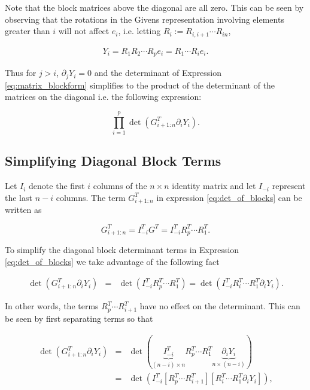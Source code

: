 \documentclass[ba]{imsart}
\numberwithin{equation}{section}
\theoremstyle{plain}
\begin{document}
\noindent Note that the block matrices above the diagonal are all zero.  This can be seen by observing that the rotations in the Givens representation involving elements greater than $i$ will not affect $e_i$, i.e. letting $R_i := R_{i,i+1} \cdots R_{in}$,

\begin{eqnarray}
Y_i = R_1 R_2 \cdots R_p e_i = R_1 \cdots R_i e_i.
\end{eqnarray}

\noindent Thus for $j > i$, $\partial_j Y_i = 0$ and the determinant of Expression \ref{eq:matrix_blockform} simplifies to the product of the determinant of the matrices on the diagonal i.e. the following expression:

\begin{equation}
\label{eq:det_of_blocks}
\prod_{i=1}^p \det \left( G_{i+1:n}^T \partial_{i} Y_i \right).
\end{equation}

\subsection{Simplifying Diagonal Block Terms}
Let $I_{i}$ denote the first $i$ columns of the $n \times n$ identity matrix and let $I_{-i}$ represent the last $n-i$ columns. The term $G_{i+1:n}^T$ in expression \ref{eq:det_of_blocks} can be written as

\begin{equation}
G_{i+1:n}^T = I_{-i}^T G^T = I_{-i}^T R_p^T \cdots R_1^T.
\end{equation}

\noindent To simplify the diagonal block determinant terms in Expression \ref{eq:det_of_blocks} we take advantage of the following fact

\begin{eqnarray}
\det \left( G_{i+1:n}^T \partial_i Y_i  \right)  &=& \det \left( I_{-i}^T R_p^T \cdots R_1^T \right) =  \det\left( I_{-i}^T R_i^T \cdots R_1^T \partial_i Y_i \right).
\end{eqnarray}

\noindent In other words, the terms $R_p^T \cdots R_{i+1}^T$ have no effect on the determinant. This can be seen by first separating terms so that

\begin{eqnarray}
\det\left(G_{i+1:n}^T \partial_{i} Y_i \right) &=& \det\left( \underbrace{I_{-i}^T}_{(n-i) \times n} R_p^T \cdots R_1^T \underbrace{\partial_i Y_i}_{n \times (n-i)} \right)\\
&=& \det\left(
I_{-i}^T
\left[ R_p^T \cdots R_{i+1}^T\right] \left[ R_i^T \cdots R_1^T \partial_i Y_i \right] \right),
\end{eqnarray}
\end{document}
